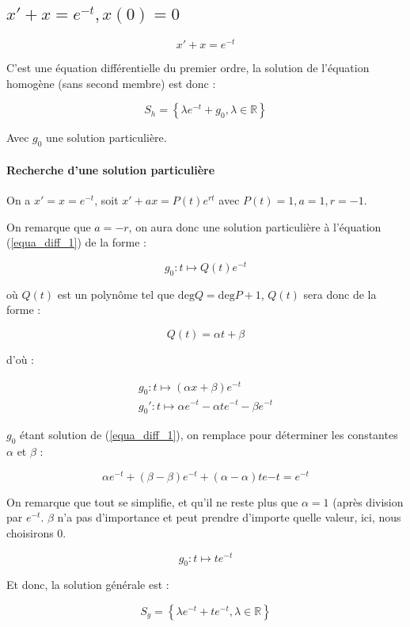 \documentclass[a4paper, 11pt]{report} %
\newcommand{\R}{\mathbb{R}}
\renewcommand{\mapsto}{\longmapsto}
\begin{document}
\subsection{$x' + x = e^{-t}, x(0) = 0$} %

\begin{equation}
x' + x = e^{-t}
\label{equa_diff_1}
\end{equation}

C'est une équation différentielle du premier ordre, la solution de l'équation homogène (sans second membre) est donc :

\[
S_h = \left\{\lambda e^{-t} + g_0, \lambda\in\R\right\}
\]

Avec $g_0$ une solution particulière.

\paragraph{Recherche d'une solution particulière}
On a $x' = x = e^{-t}$, soit $x' + ax = P(t)e^{rt}$ avec $P(t) = 1, a = 1, r = -1$.

On remarque que $a=-r$, on aura donc une solution particulière à l'équation (\ref{equa_diff_1}) de la forme :

\[ g_0 : t \mapsto Q(t)e^{-t} \]

où $Q(t)$ est un polynôme tel que $\mathrm{deg}Q = \mathrm{deg}P + 1$, $Q(t)$ sera donc de la forme :

\[ Q(t) = \alpha t + \beta \]

d'où :

\[
\begin{array}{c}
g_0 : t\mapsto (\alpha x + \beta)e^{-t}\\
g_0' : t \mapsto \alpha e^{-t} - \alpha te^{-t} - \beta e^{-t}
\end{array}
\]

$g_0$ étant solution de (\ref{equa_diff_1}), on remplace pour déterminer les constantes $\alpha$ et $\beta$ :

\[
\alpha e^{-t} + (\beta - \beta)e^{-t} + (\alpha - \alpha)te{-t} = e^{-t}
\]

On remarque que tout se simplifie, et qu'il ne reste plus que $\alpha = 1$ (après division par $e^{-t}$.
$\beta$ n'a pas d'importance et peut prendre d'importe quelle valeur, ici, nous choisirons 0.

\[ g_0 : t\mapsto te^{-t} \]

Et donc, la solution générale est :

\[ S_g = \left\{\lambda e^{-t} + te^{-t}, \lambda\in\R\right\} \]
\end{document}
